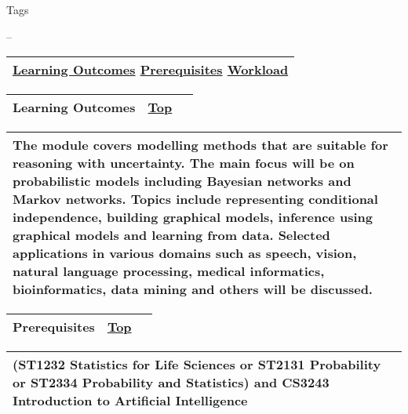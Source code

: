 \protect\hypertarget{ctl00_ctl00_ContentPlaceHolder1_ContentPlaceHolder1_LV_ctrl0_Label4}{}{Tags}

\protect\hypertarget{ctl00_ctl00_ContentPlaceHolder1_ContentPlaceHolder1_LV_ctrl0_lblTags}{}{--}

\begin{longtable}[]{@{}l@{}}
\toprule
\protect\hypertarget{ctl00_ctl00_ContentPlaceHolder1_ContentPlaceHolder1_lblSectionMiddle}{}{\protect\hyperlink{Learningux5cux2520Outcomes}{Learning
Outcomes} \textbar{} \protect\hyperlink{Prerequisites}{Prerequisites}
\textbar{} \protect\hyperlink{Workload}{Workload}}\tabularnewline
\bottomrule
\end{longtable}

{ }

\begin{longtable}[]{@{}ll@{}}
\toprule
{\protect\hypertarget{Learningux20Outcomes}{}{}Learning Outcomes} &
{\protect\hyperlink{top}{Top}~~}\tabularnewline
\bottomrule
\end{longtable}

\begin{longtable}[]{@{}l@{}}
\toprule
\protect\hypertarget{ctl00_ctl00_ContentPlaceHolder1_ContentPlaceHolder1_LV_CourseInfo_ctrl0_lblCourseInfo}{}{The
module covers modelling methods that are suitable for reasoning with
uncertainty. The main focus will be on probabilistic models including
Bayesian networks and Markov networks. Topics include representing
conditional independence, building graphical models, inference using
graphical models and learning from data. Selected applications in
various domains such as speech, vision, natural language processing,
medical informatics, bioinformatics, data mining and others will be
discussed.}\tabularnewline
\bottomrule
\end{longtable}

\begin{longtable}[]{@{}ll@{}}
\toprule
{\protect\hypertarget{Prerequisites}{}{}Prerequisites} &
{\protect\hyperlink{top}{Top}~~}\tabularnewline
\bottomrule
\end{longtable}

\begin{longtable}[]{@{}l@{}}
\toprule
\protect\hypertarget{ctl00_ctl00_ContentPlaceHolder1_ContentPlaceHolder1_LV_CourseInfo_ctrl1_lblCourseInfo}{}{(ST1232
Statistics for Life Sciences or ST2131 Probability or ST2334 Probability
and Statistics) and CS3243 Introduction to Artificial
Intelligence}\tabularnewline
\bottomrule
\end{longtable}


